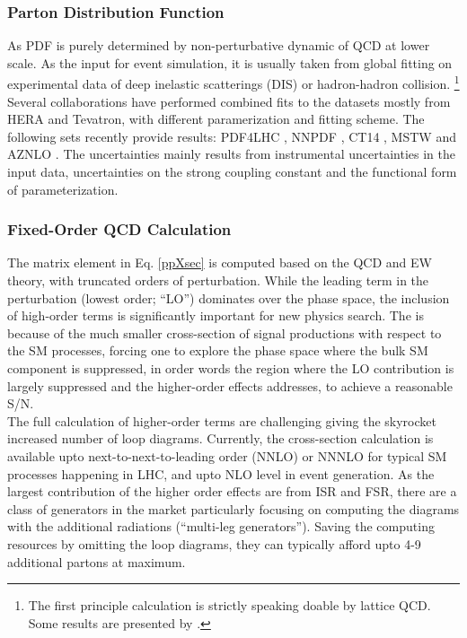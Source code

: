 


\subsubsection{Parton Distribution Function}
As PDF is purely determined by non-perturbative dynamic of QCD at lower scale.
As the input for event simulation, it is usually taken from global fitting on experimental data of deep inelastic scatterings (DIS) or hadron-hadron collision.
\footnote{The first principle calculation is strictly speaking doable by lattice QCD. Some results are presented by \cite{latticePDF}.}
Several collaborations have performed combined fits to the datasets mostly from HERA and Tevatron, with different paramerization and fitting scheme. 
The following sets recently provide results: PDF4LHC \cite{PDF4LHC}, NNPDF \cite{NNPDF}, CT14 \cite{CT14}, MSTW \cite{MSTW} and AZNLO \cite{AZNLO}. 
The uncertainties mainly results from instrumental uncertainties in the input data, uncertainties on the strong coupling constant and the functional form of parameterization. 


\subsubsection{Fixed-Order QCD Calculation}
The matrix element in Eq. \ref{ppXsec} is computed based on the QCD and EW theory, with truncated orders of perturbation.
While the leading term in the perturbation (lowest order; ``LO'') dominates over the phase space, 
the inclusion of high-order terms is significantly important for new physics search.
The is because of the much smaller cross-section of signal productions with respect to the SM processes,
forcing one to explore the phase space where the bulk SM component is suppressed, 
in order words the region where the LO contribution is largely suppressed and the higher-order effects addresses,
to achieve a reasonable S/N. \\

The full calculation of higher-order terms are challenging giving the skyrocket increased number of loop diagrams.
Currently, the cross-section calculation is available upto next-to-next-to-leading order (NNLO) or NNNLO for typical SM processes happening in LHC, and upto NLO level in event generation. As the largest contribution of the higher order effects are from ISR and FSR, there are a class of generators in the market particularly focusing on computing the diagrams with the additional radiations (``multi-leg generators''). Saving the computing resources by omitting the loop diagrams, they can typically afford upto 4-9 additional partons at maximum. \\


